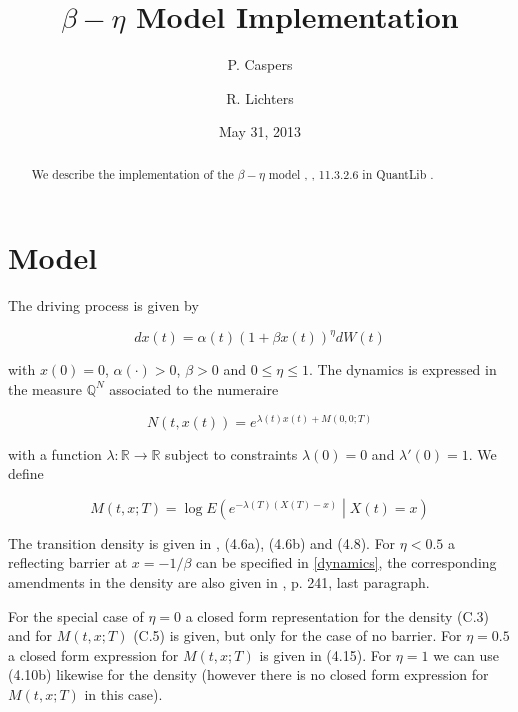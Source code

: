 \documentclass{amsart}
\theoremstyle{plain}
\numberwithin{equation}{section}
\begin{document}
\title[$\beta-\eta$ Model Implementation]{$\beta-\eta$ Model Implementation}
\author{P. Caspers}
\author{R. Lichters}
\date{May 31, 2013}
\begin{abstract}
We describe the implementation of the $\beta-\eta$ model \cite{betaeta}, \cite{piterbarg}, 11.3.2.6 in QuantLib \cite{ql}.
\end{abstract}

\maketitle

\section{Model}

The driving process is given by

\begin{equation}\label{dynamics}
dx(t) = \alpha(t) ( 1 + \beta x(t) )^\eta dW(t) 
\end{equation}

with $x(0)=0$, $\alpha(\cdot) > 0$, $\beta > 0$ and $0 \leq \eta \leq 1$. The dynamics is expressed in the measure $\mathbb{Q}^N$ associated to the numeraire

\begin{equation}
N(t,x(t)) = e^{\lambda(t)x(t)+M(0,0;T)}
\end{equation}

with a function $\lambda: \mathbb{R}\rightarrow\mathbb{R}$ subject to constraints $\lambda(0)=0$ and $\lambda'(0)=1$. We define

\begin{equation}\label{formula_M}
M(t,x;T) = \log E \left( e^{-\lambda(T)(X(T)-x)} \middle | X(t)=x \right)
\end{equation}

The transition density is given in \cite{betaeta}, (4.6a), (4.6b) and (4.8). For $\eta < 0.5$ a reflecting barrier at $x=-1/\beta$ can be specified in \ref{dynamics}, the corresponding amendments in the density are also given in \cite{betaeta}, p. 241, last paragraph.

For the special case of $\eta=0$ a closed form representation for the density (C.3) and for $M(t,x;T)$ (C.5) is given, but only for the case of no barrier. For $\eta=0.5$ a closed form expression for $M(t,x;T)$ is given in (4.15). For $\eta=1$ we can use (4.10b) likewise for the density (however there is no closed form expression for $M(t,x;T)$ in this case).
\end{document}
